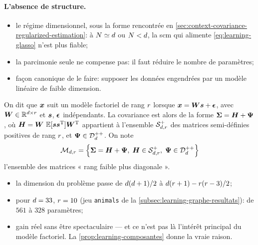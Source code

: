 \paragraph{L'absence de structure.}
\begin{itemize}
  \item le régime dimensionnel, sous la forme rencontrée en
    \cref{sec:context-covariance-regularized-estimation}: à
    $N\simeq d$ ou $N<d$, la scm qui alimente
    \cref{eq:learning-glasso} n'est plus fiable;
  \item la parcimonie seule ne compense pas: il faut réduire le nombre de
    paramètres;
  \item façon canonique de le faire: supposer les données engendrées par un
    modèle linéaire de faible dimension.
\end{itemize}

\begin{definition}
\label{def:learning-facteur}
  On dit que $\boldsymbol{x}$ suit un modèle factoriel de rang $r$ lorsque
  $\boldsymbol{x}=\boldsymbol{W}\boldsymbol{s}+\boldsymbol{\epsilon}$, avec
  $\boldsymbol{W}\in\mathbb{R}^{d\times r}$ et $\boldsymbol{s}$, $\boldsymbol{\epsilon}$
  indépendants. La covariance est alors de la forme
  $\boldsymbol{\Sigma}=\boldsymbol{H}+\boldsymbol{\Psi}$, où
  $\boldsymbol{H}=\boldsymbol{W}\,\operatorname{\mathbb{E}}[\boldsymbol{s}\boldsymbol{s}^{\mathrm{T}}]\boldsymbol{W}^{\mathrm{T}}$ appartient à
  l'ensemble $\mathcal{S}_{d,r}^{+}$ des matrices semi-définies positives de
  rang $r$, et $\boldsymbol{\Psi}\in\mathcal{D}_{d}^{++}$. On note
  \begin{equation}
    \mathcal{M}_{d,r}
    =
    \left\{\boldsymbol{\Sigma}=\boldsymbol{H}+\boldsymbol{\Psi},\;
    \boldsymbol{H}\in\mathcal{S}_{d,r}^{+},\;
    \boldsymbol{\Psi}\in\mathcal{D}_{d}^{++}\right\}
    \label{eq:learning-factorman}
  \end{equation}
  l'ensemble des matrices « rang faible plus diagonale ».
\end{definition}

\begin{remark}
\label{rem:learning-gain-parametres}
  \begin{itemize}
    \item la dimension du problème passe de $d(d+1)/2$ à
      $d(r+1)-r(r-3)/2$;
    \item pour $d=33$, $r=10$ (jeu \texttt{animals} de la
      \cref{subsec:learning-graphe-resultats}): de $561$ à $328$ paramètres;
    \item gain réel sans être spectaculaire --- et ce n'est pas là l'intérêt
      principal du modèle factoriel. La \cref{prop:learning-composantes} donne
      la vraie raison.
  \end{itemize}
  \leavevmode
\end{remark}

